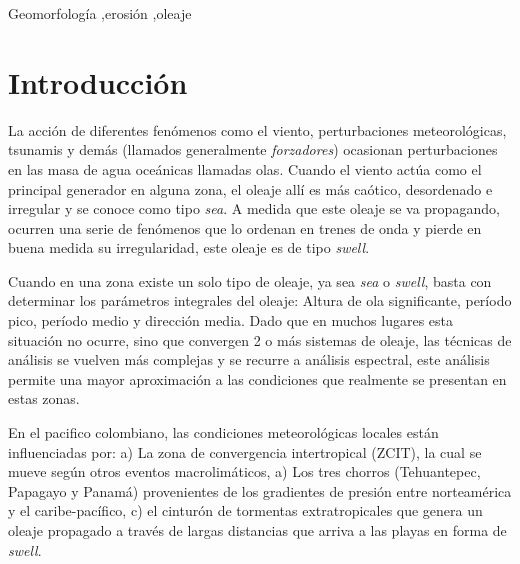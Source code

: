 \documentclass[5p,times,authoryear]{elsarticle}
\begin{document}
\begin{frontmatter}
\begin{abstract}
\end{abstract}

\begin{keyword}


Geomorfología \sep erosión \sep oleaje 

\end{keyword}

\end{frontmatter}


\section{Introducción}

La acción de diferentes fenómenos como el viento, perturbaciones meteorológicas, tsunamis y demás (llamados generalmente \textit{forzadores}) ocasionan perturbaciones en las masa de agua oceánicas llamadas olas. Cuando el viento actúa como el principal generador en alguna zona, el oleaje allí es más caótico, desordenado e irregular y se conoce como tipo \textit{sea}. A medida que este oleaje se va propagando, ocurren una serie de fenómenos que lo ordenan en trenes de onda y pierde en buena medida su irregularidad, este oleaje es de tipo \textit{swell}.

Cuando en una zona existe un solo tipo de oleaje, ya sea \textit{sea } o \textit{swell}, basta con determinar los parámetros integrales del oleaje: Altura de ola significante, período pico, período medio y dirección media. Dado que en muchos lugares esta situación no ocurre, sino que convergen 2 o más sistemas de oleaje, las técnicas de análisis se vuelven más complejas y se recurre a análisis espectral, este análisis permite una mayor aproximación a las condiciones que realmente se presentan en estas zonas.

En el pacifico colombiano, las condiciones meteorológicas locales están influenciadas por: a) La zona de convergencia intertropical (ZCIT), la cual se mueve según otros eventos macrolimáticos, a) Los tres chorros (Tehuantepec, Papagayo y Panamá) provenientes de los gradientes de presión entre norteamérica y el caribe-pacífico, c) el cinturón de tormentas extratropicales que genera un oleaje propagado a través de largas distancias que arriva a las playas en forma de \textit{swell}.
\end{document}
